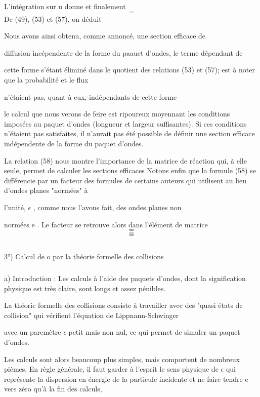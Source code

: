 
L'intégration sur u donne 
et finalement
\[
\tag{57}=
\]
De (49), (53) et (57), on déduit

Nous avons ainsi obtenu, comme annoncé, une section efficace de

diffusion incépendente de la forme du paauet d'ondes, le terme dépendant de

cette forme  s'étant éliminé dans le quotient des relations
(53) et (57);  est à noter que la probabilité  et le flux

 n'étaient pas, quant à eux, indépendants de cette forme

le calcul que nous verons de feire est ripoureux moyennant les
conditions imposées au paquet d'ondes (longueur et largeur suffisantes).
Si ces conditions n'étaient pas satisfaites, il n'aurait pas été possible de
définir une section efficace indépendente de la forme du paquet d'ondes.

La relation (58) nous montre l'importance de la matrice  de
réaction qui, à elle seule, permet de calculer les sections efficaces
Notons enfin que la formule (58) se différencie par un facteur  des formules de
certains auteurs qui utilisent au lieu d'ondes planes "normées" à

l'unité,  $\epsilon$ , comme nous l'avons fait, des ondes planes non

normées e . Le facteur  se retrouve alors dans l'élément de
matrice
\[
\tag{59}=
\]
\[
\tag{60}=
\]
\[
\tag{61}=
\]

\subsection{}%
3°) Calcul de o par la théorie formelle des collisions

\subsubsection{}%
a) Introduction : Les calculs à l'aide des paquets d'ondes,
dont la signification physique est très claire, sont longs et assez pénibles.

La théorie formelle des collisions consiste à travailler avec
des "quasi états de collision"  qui vérifient l'équation de
Lippnann-Schwinger

avec un paremètre $\epsilon$ petit mais non nul, ce qui permet de simuler un paquet
d'ondes.

Les calculs sont alors beaucoup plus simples, mais comportent de
nombreux pièmes. En règle générale, il faut garder à l'esprit le sens physique
de $\epsilon$ qui représente la dispersion en énergie de la particule incidente
et ne faire tendre e vers zéro qu'à la fin des calculs,

